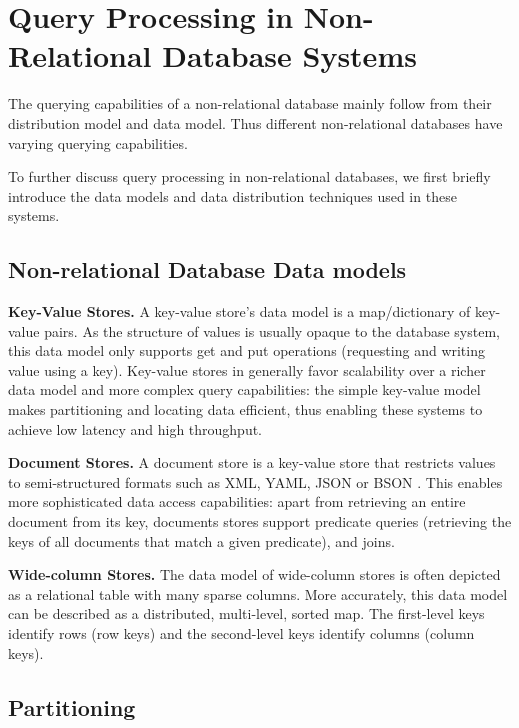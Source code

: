 \section{Query Processing in Non-Relational Database Systems}

The querying capabilities of a non-relational database mainly follow from their distribution model and data model.
Thus different non-relational databases have varying querying capabilities.

To further discuss query processing in non-relational databases,
we first briefly introduce the data models and data distribution techniques used in these systems.

\subsection{Non-relational Database Data models}
\noindent
\textbf{Key-Value Stores.}
A key-value store's data model is a map/dictionary of key-value pairs.
As the structure of values is usually opaque to the database system, this data model only supports get and put operations
(requesting and writing value using a key).
Key-value stores in generally favor scalability over a richer data model and more complex query capabilities:
the simple key-value model makes partitioning and locating data efficient, thus enabling these systems to achieve low
latency and high throughput.

\bigskip
\noindent
\textbf{Document Stores.}
A document store is a key-value store that restricts values to semi-structured formats such as
XML, YAML, JSON or BSON \cite{bson:spec}.
This enables more sophisticated data access capabilities:
apart from retrieving an entire document from its key, documents stores support predicate queries
(retrieving the keys of all documents that match a given predicate), and joins.

\bigskip
\noindent
\textbf{Wide-column Stores.}
The data model of wide-column stores is often depicted as a relational table with many sparse columns.
More accurately, this data model can be described as a distributed, multi-level, sorted map.
The first-level keys identify rows (row keys) and the second-level keys identify columns (column keys).

\subsection{Partitioning}
\label{sec:partitioning}

